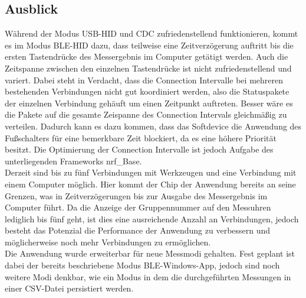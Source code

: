 \subsection{Ausblick}
Während der Modus \ac{USB}-\ac{HID} und \ac{CDC} zufriedenstellend funktionieren, kommt es im Modus \ac{BLE}-\ac{HID} dazu, dass teilweise eine Zeitverzögerung auftritt bis die ersten Tastendrücke des Messergebnis im Computer getätigt werden. Auch die Zeitspanne zwischen den einzelnen Tastendrücke ist nicht zufriedenstellend und variert. Dabei steht in Verdacht, dass die Connection Intervalle bei mehreren bestehenden Verbindungen nicht gut koordiniert werden, also die Statuspakete der einzelnen Verbindung gehäuft um einen Zeitpunkt auftreten. Besser wäre es die Pakete auf die gesamte Zeispanne des Connection Intervals gleichmäßig zu verteilen. Dadurch kann es dazu kommen, dass das Softdevice die Anwendung des Fußschalters für eine bemerkbare Zeit blockiert, da es eine höhere Priorität besitzt. Die Optimierung der Connection Intervalle ist jedoch Aufgabe des unterliegenden Frameworks nrf\_Base.\\
Derzeit sind bis zu fünf Verbindungen mit Werkzeugen und eine Verbindung mit einem Computer möglich. Hier kommt der Chip der Anwendung bereits an seine Grenzen, was in Zeitverzögerungen bis zur Ausgabe des Messergebnis im Computer führt. Da die Anzeige der Gruppennummer auf den Messuhren lediglich bis fünf geht, ist dies eine ausreichende Anzahl an Verbindungen, jedoch besteht das Potenzial die Performance der Anwendung zu verbessern und möglicherweise noch mehr Verbindungen zu ermöglichen.\\
Die Anwendung wurde erweiterbar für neue Messmodi gehalten. Fest geplant ist dabei der bereits beschriebene Modus \ac{BLE}-Windows-App, jedoch sind noch weitere Modi denkbar, wie ein Modus in dem die durchgeführten Messungen in einer \ac{CSV}-Datei persistiert werden.\\
